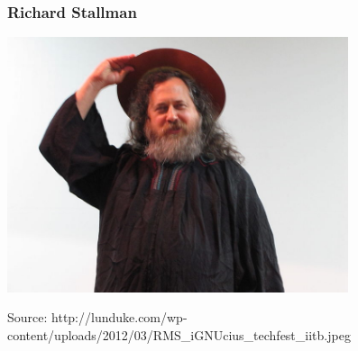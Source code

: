 
\begin{frame}
\frametitle{Richard Stallman}

\begin{center}
  \includegraphics[width=10cm]{figs/stallman.jpg}
\end{center}


\begin{flushright}
{\tiny
Source: http://lunduke.com/wp-content/uploads/2012/03/RMS\_iGNUcius\_techfest\_iitb.jpeg
}
\end{flushright}

\end{frame}


